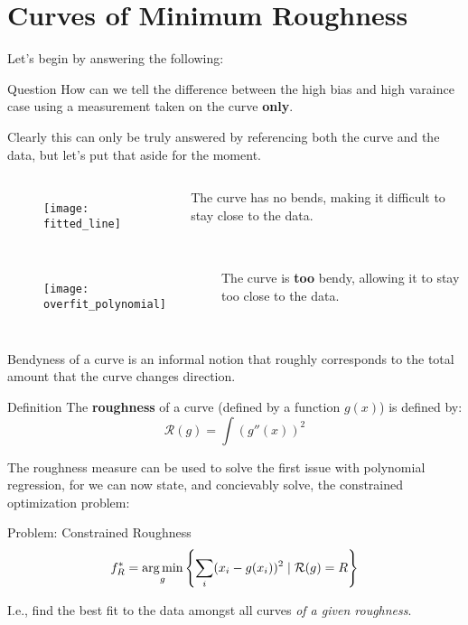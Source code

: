 \section{Curves of Minimum Roughness}
%
%
\begin{frame}
  Let's begin by answering the following:
  \begin{block}{Question}
    How can we tell the difference between the high bias and high varaince case using a measurement taken on the curve \textbf{only}.
  \end{block}
  Clearly this can only be truly answered by referencing both the curve and the data, but let's put that aside for the moment.
\end{frame}
%
%
\begin{frame}
  \begin{columns}
      \begin{figure}
        \texttt{[image: fitted\_line]}
      \end{figure}
      The curve has no bends, making it difficult to stay close to the data.
  \end{columns}
\end{frame}
%
%
\begin{frame}
  \begin{columns}
      \begin{figure}
        \texttt{[image: overfit\_polynomial]}
      \end{figure}
      The curve is \textbf{too} bendy, allowing it to stay too close to the data.
  \end{columns}
\end{frame}
%
%
\begin{frame}
  Bendyness of a curve is an informal notion that roughly corresponds to the total amount that the curve changes direction.
\end{frame}
%
%
\begin{frame}
  \begin{block}{Definition}
    The \textbf{roughness} of a curve (defined by a function $g(x)$) is defined by:
    $$ \mathcal{R}(g) = \int (g''(x))^2 $$
  \end{block}
\end{frame}
%
%
\begin{frame}
  The roughness measure can be used to solve the first issue with polynomial regression, for we can now state, and concievably solve, the constrained optimization problem:
  \begin{block}{Problem: Constrained Roughness}
    $$ f_R^* = \operatorname*{arg\,min}_{g} \left\{ \sum_i (x_i - g(x_i))^2 \mid \mathcal{R}(g) = R \right\} $$
  \end{block}
  I.e., find the best fit to the data amongst all curves \textit{of a given roughness}.
\end{frame}
